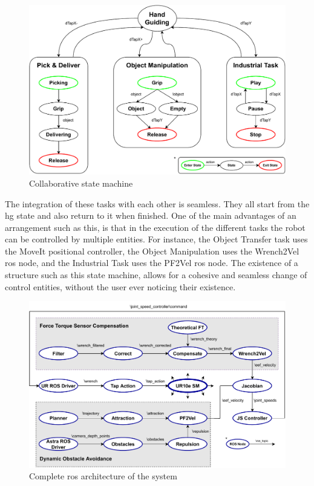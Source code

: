 \begin{figure}[h]
    \centering
    \includegraphics[width=0.8\linewidth]{figs/chp5/ros_ur10e_smach.pdf}
    \caption{Collaborative state machine}
    \label{fig:ros_smach}
\end{figure}

\par The integration of these tasks with each other is seamless. They all start from the \ac{hg} state and also return to it when finished. One of the main advantages of an arrangement such as this, is that in the execution of the different tasks the robot can be controlled by multiple entities. For instance, the Object Transfer task uses the MoveIt positional controller, the Object Manipulation uses the Wrench2Vel \ac{ros} node, and the Industrial Task uses the PF2Vel \ac{ros} node. The existence of a structure such as this state machine, allows for a cohesive and seamless change of control entities, without the user ever noticing their existence.

\begin{figure}[h]
    \centering
    \includegraphics[width=0.85\linewidth]{figs/chp5/ros_cobot_arch.pdf}
    \caption{Complete \ac{ros} architecture of the system}
    \label{fig:ros_cobot_arch}
\end{figure}


